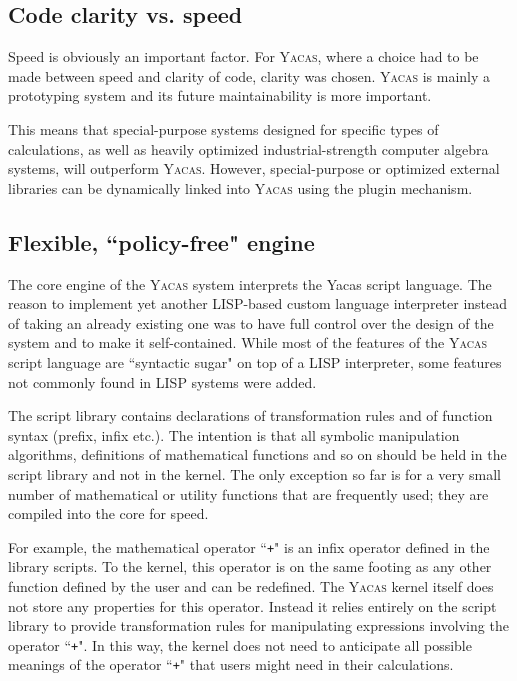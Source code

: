 \documentclass{llncs}
\begin{document}
\subsection*{%
Code clarity vs. speed}
Speed is obviously an important factor. For \textsc{Yacas}, where a choice had to be
made between speed and clarity of code, clarity was chosen. \textsc{Yacas} is mainly a
prototyping system and its future maintainability is more important.

This means that special-purpose systems designed for specific types of
calculations, as well as heavily optimized industrial-strength computer algebra
systems, will outperform \textsc{Yacas}. However, special-purpose or optimized external
libraries can be dynamically linked into \textsc{Yacas} using the plugin mechanism.

\subsection*{%
Flexible, ``policy-free" engine}
The core engine of the \textsc{Yacas} system interprets the Yacas script language.
The reason to implement yet another LISP-based custom language interpreter
instead of taking an already existing one was to have full control over the
design of the system and to make it self-contained.
While most of the features of the \textsc{Yacas} script language are ``syntactic sugar" on top of a LISP 
interpreter, some features not commonly found in LISP systems were added.

The script library contains declarations of transformation rules and of function
syntax (prefix, infix etc.). The intention is that all symbolic manipulation algorithms, definitions
of mathematical functions and so on should be held in the script library and not in the kernel. The
only exception so far is for a very small number of mathematical or utility
functions that are frequently used; they are compiled into the core for speed.

For example, the mathematical operator ``\small{\texttt{+}}" is an infix operator defined in the
library scripts. To the kernel, this operator is on the same footing as any
other function defined by the user and can be redefined. The \textsc{Yacas} kernel
itself does not store any properties for this operator. Instead it relies
entirely on the script library to provide transformation rules for manipulating
expressions involving the operator ``\small{\texttt{+}}". In this way, the kernel does not need
to anticipate all possible meanings of the operator ``\small{\texttt{+}}" that users might need
in their calculations.
\end{document}
